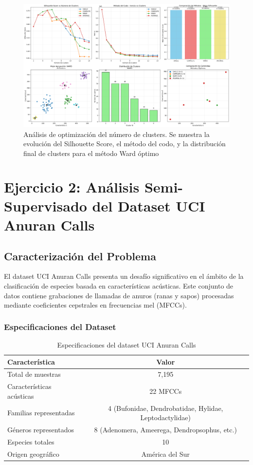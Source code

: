 \documentclass[12pt,a4paper]{article}
\begin{document}
\begin{figure}[H]
    \centering
    \includegraphics[width=\textwidth]{figures/figura_03_optimizacion_clusters.png}
    \caption{Análisis de optimización del número de clusters. Se muestra la evolución del Silhouette Score, el método del codo, y la distribución final de clusters para el método Ward óptimo}
    \label{fig:optimizacion}
\end{figure}

\section{Ejercicio 2: Análisis Semi-Supervisado del Dataset UCI Anuran Calls}

\subsection{Caracterización del Problema}
El dataset UCI Anuran Calls presenta un desafío significativo en el ámbito de la clasificación de especies basada en características acústicas. Este conjunto de datos contiene grabaciones de llamadas de anuros (ranas y sapos) procesadas mediante coeficientes cepstrales en frecuencias mel (MFCCs).

\subsubsection{Especificaciones del Dataset}
\begin{table}[H]
\centering
\begin{tabular}{|l|c|}
\hline
\textbf{Característica} & \textbf{Valor} \\
\hline
Total de muestras & 7,195 \\
Características acústicas & 22 MFCCs \\
Familias representadas & 4 (Bufonidae, Dendrobatidae, Hylidae, Leptodactylidae) \\
Géneros representados & 8 (Adenomera, Ameerega, Dendropsophus, etc.) \\
Especies totales & 10 \\
Origen geográfico & América del Sur \\
\hline
\end{tabular}
\caption{Especificaciones del dataset UCI Anuran Calls}
\end{table}
\end{document}
